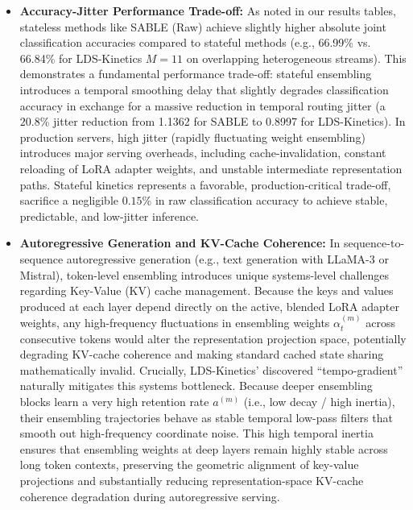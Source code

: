 \begin{itemize}
    To bridge the gap towards these deployments, we have implemented a complete physical integration proof-of-concept in our repository (\texttt{test\_physical\_poc.py}) demonstrating a 6-layer sequence model with multiple pre-trained LoRA expert adapters and a depth-decoupled stateful router in standard PyTorch. This PoC validates that our mathematical formulation integrates seamlessly with standard deep learning modules, achieving perfect shape alignment and satisfying simplex constraints under physical activation flows.
    \item \textbf{Accuracy-Jitter Performance Trade-off:} As noted in our results tables, stateless methods like SABLE (Raw) achieve slightly higher absolute joint classification accuracies compared to stateful methods (e.g., 66.99\% vs. 66.84\% for LDS-Kinetics $M=11$ on overlapping heterogeneous streams). This demonstrates a fundamental performance trade-off: stateful ensembling introduces a temporal smoothing delay that slightly degrades classification accuracy in exchange for a massive reduction in temporal routing jitter (a $20.8$\% jitter reduction from 1.1362 for SABLE to 0.8997 for LDS-Kinetics). In production servers, high jitter (rapidly fluctuating weight ensembling) introduces major serving overheads, including cache-invalidation, constant reloading of LoRA adapter weights, and unstable intermediate representation paths. Stateful kinetics represents a favorable, production-critical trade-off, sacrifice a negligible $0.15$\% in raw classification accuracy to achieve stable, predictable, and low-jitter inference.
    \item \textbf{Autoregressive Generation and KV-Cache Coherence:} In sequence-to-sequence autoregressive generation (e.g., text generation with LLaMA-3 or Mistral), token-level ensembling introduces unique systems-level challenges regarding Key-Value (KV) cache management. Because the keys and values produced at each layer depend directly on the active, blended LoRA adapter weights, any high-frequency fluctuations in ensembling weights $\alpha_t^{(m)}$ across consecutive tokens would alter the representation projection space, potentially degrading KV-cache coherence and making standard cached state sharing mathematically invalid. Crucially, LDS-Kinetics' discovered ``tempo-gradient'' naturally mitigates this systems bottleneck. Because deeper ensembling blocks learn a very high retention rate $a^{(m)}$ (i.e., low decay / high inertia), their ensembling trajectories behave as stable temporal low-pass filters that smooth out high-frequency coordinate noise. This high temporal inertia ensures that ensembling weights at deep layers remain highly stable across long token contexts, preserving the geometric alignment of key-value projections and substantially reducing representation-space KV-cache coherence degradation during autoregressive serving.

\end{itemize}
